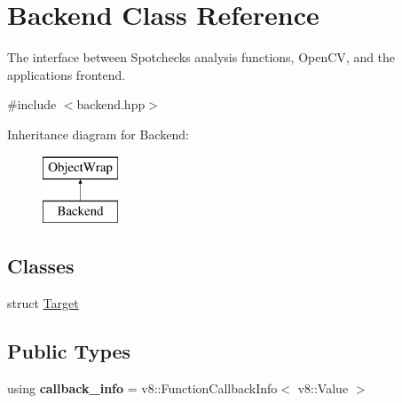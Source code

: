 \hypertarget{class_backend}{}\section{Backend Class Reference}
\label{class_backend}


The interface between Spotcheck\textquotesingle{}s analysis functions, Open\+CV, and the application\textquotesingle{}s frontend.  




{\ttfamily \#include $<$backend.\+hpp$>$}

Inheritance diagram for Backend\+:\begin{figure}[H]
\begin{center}
\leavevmode
\includegraphics[height=2.000000cm]{class_backend}
\end{center}
\end{figure}
\subsection*{Classes}
\begin{DoxyCompactItemize}
\item 
struct \hyperlink{struct_backend_1_1_target}{Target}
\end{DoxyCompactItemize}
\subsection*{Public Types}
\begin{DoxyCompactItemize}
\item 
\mbox{\label{class_backend_a311090170815b6db258f8f6ad08ba3f9}} 
using {\bfseries callback\+\_\+info} = v8\+::\+Function\+Callback\+Info$<$ v8\+::\+Value $>$
\end{DoxyCompactItemize}
